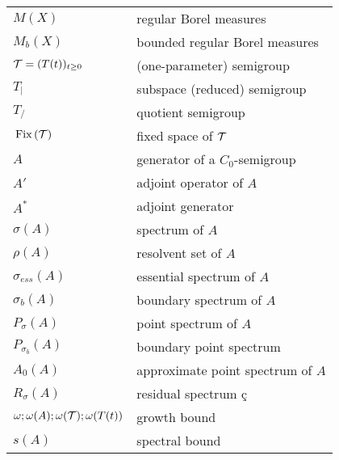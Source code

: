 \begin{longtable}{p{}p{}}
$M(X)$ & regular Borel measures \\ %
$M_{b}(X)$ & bounded regular Borel measures \\ %
$\mathcal{T} = (T(t))_{t \geq 0}$ & (one-parameter) semigroup \\ %
$T_{|}$ & subspace (reduced) semigroup \\ %
$T_{/}$ & quotient semigroup \\ %
$\mathop{}\mathrm{Fix}\left(\mathcal{T}\right)$ & fixed space of $\mathcal{T}$ \\ %
%
%
%
$A$ & generator of a $C_{0}$-semigroup\\ %
$A'$ & adjoint operator of $A$\\ %
$A^*$ & adjoint generator \\ %
$\sigma(A)$ & spectrum of $A$\\ %
$\rho(A)$ & resolvent set of $A$\\ %
$\sigma_{ess}(A)$ & essential spectrum of $A$\\ %
$\sigma_{b}(A)$ & boundary spectrum of $A$\\ %
$P_{\sigma}(A)$ & point spectrum of $A$\\ %
$P_{\sigma_b}(A)$ & boundary point spectrum \\ %
$A_{0}(A)$ & approximate point spectrum of $A$\\ %
$R_{\sigma}(A)$ & residual spectrum \c c\\ %
$\omega; \omega(A); \omega(\mathcal{T}); \omega(T(t))$ & growth bound \\ %
$s(A)$ & spectral bound \\ %

\end{longtable}
